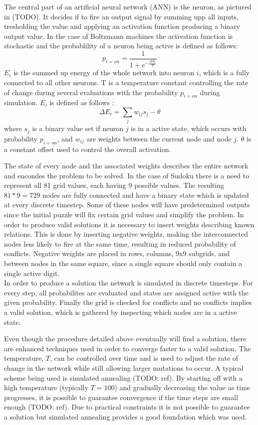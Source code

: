 \documentclass[a4paper,11pt]{kth-mag}
\begin{document}
The central part of an artificial neural network (ANN) is the neuron, as pictured in (TODO).
It decides if to fire an output signal by summing upp all inputs, tresholding the value and applying an activation function producing a binary output value.
In the case of Boltzmann machines the activation function is stochastic and the probablility of a neuron being active is defined as follows:
\[
p_{i=on} = \frac{1}{1+e^{-\frac{\Delta E_{i}}{T}}}
\]
$E_i$ is the summed up energy of the whole network into neuron $i$, which is a fully connected to all other neurons.
T is a temperature constant controlling the rate of change during several evaluations with the probability $p_{i=on}$ during simulation.
$E_i$ is defined as follows \cite{boltzmann2}:
\[
\Delta E_{i} = \sum_{j} w_{ij} s_{j} - \theta
\]
where $s_j$ is a binary value set if neuron $j$ is in a active state, which occurs with probability $p_{i=on}$, and $w_{ij}$ are weights between the current node and node $j$. $\theta$ is a constant offset used to control the overall activation.

The state of every node and the associated weights describes the entire network and encondes the problem to be solved.
In the case of Sudoku there is a need to represent all 81 grid values, each having 9 possible values.
The resulting $81*9=729$ nodes are fully connected and have a binary state which is updated at every discrete timestep.
Some of these nodes will have predetermined outputs since the initial puzzle will fix certain grid values and simplify the problem.
In order to produce valid solutions it is necessary to insert weights describing known relations.
This is done by inserting negative weights, making the interconnected nodes less likely to fire at the same time, resulting in reduced probability of conflicts.
Negative weights are placed in rows, columns, 9x9 subgrids, and between nodes in the same square, since a single square should only contain a single active digit.\\

In order to produce a solution the network is simulated in discrete timesteps.
For every step, all probabilites are evaluated and states are assigned active with the given probability.
Finally the grid is checked for conflicts and no conflicts implies a valid solution, which is gathered by inspecting which nodes are in a active state.

Even though the procedure detailed above eventually will find a solution, there are enhanced techniques used in order to converge faster to a valid solution.
The temperature, $T$, can be controlled over time and is used to adjust the rate of change in the network while still allowing larger mutations to occur.
A typical scheme being used is simulated annealing (TODO: ref).
By starting off with a high temperature (typically $T = 100$) and gradually decreasing the value as time progresses, it is possible to guarantee convergence if the time steps are small enough (TODO: ref).
Due to practical constraints it is not possible to guarantee a solution but simulated annealing provides a good foundation which was used.\\
\end{document}
